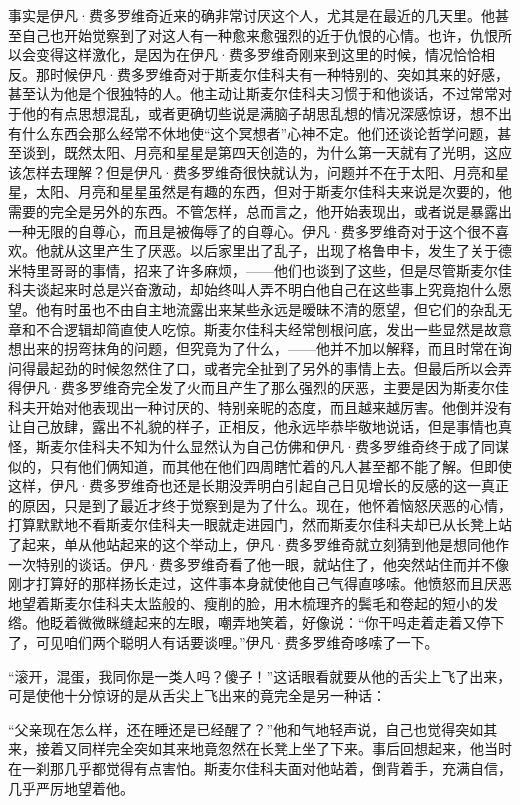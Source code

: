 \par 事实是伊凡·费多罗维奇近来的确非常讨厌这个人，尤其是在最近的几天里。他甚至自己也开始觉察到了对这人有一种愈来愈强烈的近于仇恨的心情。也许，仇恨所以会变得这样激化，是因为在伊凡·费多罗维奇刚来到这里的时候，情况恰恰相反。那时候伊凡·费多罗维奇对于斯麦尔佳科夫有一种特别的、突如其来的好感，甚至认为他是个很独特的人。他主动让斯麦尔佳科夫习惯于和他谈话，不过常常对于他的有点思想混乱，或者更确切些说是满脑子胡思乱想的情况深感惊讶，想不出有什么东西会那么经常不休地使“这个冥想者”心神不定。他们还谈论哲学问题，甚至谈到，既然太阳、月亮和星星是第四天创造的，为什么第一天就有了光明，这应该怎样去理解？但是伊凡·费多罗维奇很快就认为，问题并不在于太阳、月亮和星星，太阳、月亮和星星虽然是有趣的东西，但对于斯麦尔佳科夫来说是次要的，他需要的完全是另外的东西。不管怎样，总而言之，他开始表现出，或者说是暴露出一种无限的自尊心，而且是被侮辱了的自尊心。伊凡·费多罗维奇对于这个很不喜欢。他就从这里产生了厌恶。以后家里出了乱子，出现了格鲁申卡，发生了关于德米特里哥哥的事情，招来了许多麻烦，——他们也谈到了这些，但是尽管斯麦尔佳科夫谈起来时总是兴奋激动，却始终叫人弄不明白他自己在这些事上究竟抱什么愿望。他有时虽也不由自主地流露出来某些永远是暧昧不清的愿望，但它们的杂乱无章和不合逻辑却简直使人吃惊。斯麦尔佳科夫经常刨根问底，发出一些显然是故意想出来的拐弯抹角的问题，但究竟为了什么，——他并不加以解释，而且时常在询问得最起劲的时候忽然住了口，或者完全扯到了另外的事情上去。但最后所以会弄得伊凡·费多罗维奇完全发了火而且产生了那么强烈的厌恶，主要是因为斯麦尔佳科夫开始对他表现出一种讨厌的、特别亲昵的态度，而且越来越厉害。他倒并没有让自己放肆，露出不礼貌的样子，正相反，他永远毕恭毕敬地说话，但是事情也真怪，斯麦尔佳科夫不知为什么显然认为自己仿佛和伊凡·费多罗维奇终于成了同谋似的，只有他们俩知道，而其他在他们四周瞎忙着的凡人甚至都不能了解。但即使这样，伊凡·费多罗维奇也还是长期没弄明白引起自己日见增长的反感的这一真正的原因，只是到了最近才终于觉察到是为了什么。现在，他怀着恼怒厌恶的心情，打算默默地不看斯麦尔佳科夫一眼就走进园门，然而斯麦尔佳科夫却已从长凳上站了起来，单从他站起来的这个举动上，伊凡·费多罗维奇就立刻猜到他是想同他作一次特别的谈话。伊凡·费多罗维奇看了他一眼，就站住了，他突然站住而并不像刚才打算好的那样扬长走过，这件事本身就使他自己气得直哆嗦。他愤怒而且厌恶地望着斯麦尔佳科夫太监般的、瘦削的脸，用木梳理齐的鬓毛和卷起的短小的发绺。他眨着微微眯缝起来的左眼，嘲弄地笑着，好像说：“你干吗走着走着又停下了，可见咱们两个聪明人有话要谈哩。”伊凡·费多罗维奇哆嗦了一下。
\par “滚开，混蛋，我同你是一类人吗？傻子！”这话眼看就要从他的舌尖上飞了出来，可是使他十分惊讶的是从舌尖上飞出来的竟完全是另一种话：
\par “父亲现在怎么样，还在睡还是已经醒了？”他和气地轻声说，自己也觉得突如其来，接着又同样完全突如其来地竟忽然在长凳上坐了下来。事后回想起来，他当时在一刹那几乎都觉得有点害怕。斯麦尔佳科夫面对他站着，倒背着手，充满自信，几乎严厉地望着他。
